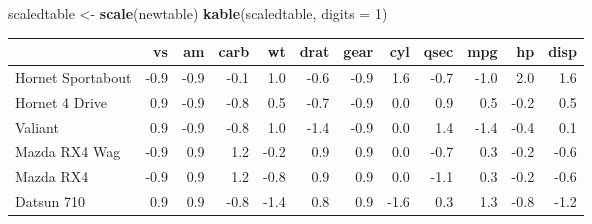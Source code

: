 \documentclass[]{article}
\newenvironment{Shaded}{\begin{snugshade}}{\end{snugshade}}
\newcommand{\KeywordTok}[1]{\textcolor[rgb]{0.13,0.29,0.53}{\textbf{#1}}}
\newcommand{\DataTypeTok}[1]{\textcolor[rgb]{0.13,0.29,0.53}{#1}}
\newcommand{\DecValTok}[1]{\textcolor[rgb]{0.00,0.00,0.81}{#1}}
\newcommand{\StringTok}[1]{\textcolor[rgb]{0.31,0.60,0.02}{#1}}
\newcommand{\NormalTok}[1]{#1}
\begin{document}
\begin{Shaded}
\begin{Highlighting}[]
\NormalTok{scaledtable <-}\StringTok{ }\KeywordTok{scale}\NormalTok{(newtable)}
\KeywordTok{kable}\NormalTok{(scaledtable, }\DataTypeTok{digits =} \DecValTok{1}\NormalTok{)}
\end{Highlighting}
\end{Shaded}

\begin{longtable}[]{@{}lrrrrrrrrrrr@{}}
\toprule
& vs & am & carb & wt & drat & gear & cyl & qsec & mpg & hp &
disp\tabularnewline
\midrule
\endhead
Hornet Sportabout & -0.9 & -0.9 & -0.1 & 1.0 & -0.6 & -0.9 & 1.6 & -0.7
& -1.0 & 2.0 & 1.6\tabularnewline
Hornet 4 Drive & 0.9 & -0.9 & -0.8 & 0.5 & -0.7 & -0.9 & 0.0 & 0.9 & 0.5
& -0.2 & 0.5\tabularnewline
Valiant & 0.9 & -0.9 & -0.8 & 1.0 & -1.4 & -0.9 & 0.0 & 1.4 & -1.4 &
-0.4 & 0.1\tabularnewline
Mazda RX4 Wag & -0.9 & 0.9 & 1.2 & -0.2 & 0.9 & 0.9 & 0.0 & -0.7 & 0.3 &
-0.2 & -0.6\tabularnewline
Mazda RX4 & -0.9 & 0.9 & 1.2 & -0.8 & 0.9 & 0.9 & 0.0 & -1.1 & 0.3 &
-0.2 & -0.6\tabularnewline
Datsun 710 & 0.9 & 0.9 & -0.8 & -1.4 & 0.8 & 0.9 & -1.6 & 0.3 & 1.3 &
-0.8 & -1.2\tabularnewline
\bottomrule
\end{longtable}
\end{document}

